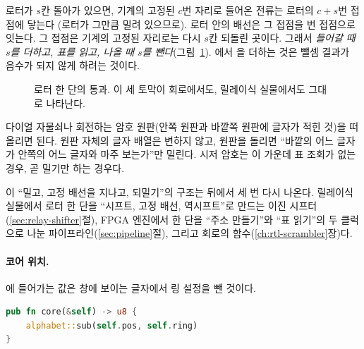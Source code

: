 \Why 로터가 $s$칸 돌아가 있으면, 기계의 고정된 $c$번 자리로 들어온 전류는 로터의 $c+s$번 접점에 닿는다
(로터가 그만큼 밀려 있으므로). 로터 안의 배선은 그 접점을 번 접점으로 잇는다. 그 접점은
기계의 고정된 자리로는 다시 $s$칸 되돌린 곳이다. 그래서 \emph{들어갈 때 $s$를 더하고, 표를 읽고, 나올 때
$s$를 뺀다}(그림~\ref{fig:g-through}). 에서 을 더하는 것은 뺄셈 결과가 음수가
되지 않게 하려는 것이다.

\begin{figure}[ht]
\centering
{}
\caption{로터 한 단의 통과. 이 세 토막이 회로에서도, 릴레이식 실물에서도 그대로 나타난다.}
\label{fig:g-through}
\end{figure}

\General 다이얼 자물쇠나 회전하는 암호 원판(안쪽 원판과 바깥쪽 원판에 글자가 적힌 것)을 떠올리면 된다.
원판 자체의 글자 배열은 변하지 않고, 원판을 돌리면 ``바깥의 어느 글자가 안쪽의 어느 글자와 마주 보는가''만
밀린다. 시저 암호는 이 가운데 표 조회가 없는 경우, 곧 밀기만 하는 경우다.

\Ours 이 ``밀고, 고정 배선을 지나고, 되밀기''의 구조는 뒤에서 세 번 다시 나온다. 릴레이식 실물에서 로터
한 단을 ``시프트, 고정 배선, 역시프트''로 만드는 이진 시프터(\ref{sec:relay-shifter}절), FPGA 엔진에서 한 단을
``주소 만들기''와 ``표 읽기''의 두 클럭으로 나눈 파이프라인(\ref{sec:pipeline}절), 그리고 회로의 
함수(\ref{ch:rtl-scrambler}장)다.

\paragraph{코어 위치.} 에 들어가는 값은 창에 보이는 글자에서 링 설정을 뺀 것이다.

\begin{lstlisting}[language=Rust,numbers=none]
pub fn core(&self) -> u8 {
    alphabet::sub(self.pos, self.ring)
}
\end{lstlisting}

